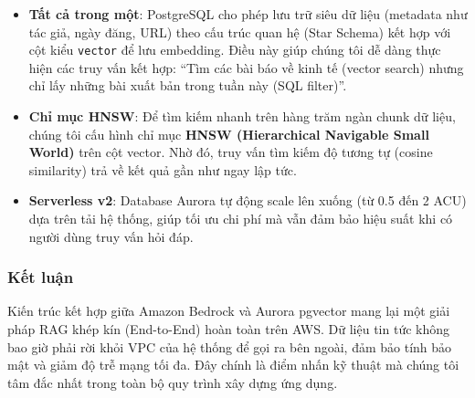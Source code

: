 \begin{itemize}
\tightlist
\item
  \textbf{Tất cả trong một}: PostgreSQL cho phép lưu trữ siêu dữ liệu
  (metadata như tác giả, ngày đăng, URL) theo cấu trúc quan hệ (Star
  Schema) kết hợp với cột kiểu \texttt{vector} để lưu embedding. Điều
  này giúp chúng tôi dễ dàng thực hiện các truy vấn kết hợp: ``Tìm các
  bài báo về kinh tế (vector search) nhưng chỉ lấy những bài xuất bản
  trong tuần này (SQL filter)''.
\item
  \textbf{Chỉ mục HNSW}: Để tìm kiếm nhanh trên hàng trăm ngàn chunk dữ
  liệu, chúng tôi cấu hình chỉ mục \textbf{HNSW (Hierarchical Navigable
  Small World)} trên cột vector. Nhờ đó, truy vấn tìm kiếm độ tương tự
  (cosine similarity) trả về kết quả gần như ngay lập tức.
\item
  \textbf{Serverless v2}: Database Aurora tự động scale lên xuống (từ
  0.5 đến 2 ACU) dựa trên tải hệ thống, giúp tối ưu chi phí mà vẫn đảm
  bảo hiệu suất khi có người dùng truy vấn hỏi đáp.
\end{itemize}

\hypertarget{kux1ebft-luux1eadn}{%
\subsubsection{Kết luận}}

Kiến trúc kết hợp giữa Amazon Bedrock và Aurora pgvector mang lại một
giải pháp RAG khép kín (End-to-End) hoàn toàn trên AWS. Dữ liệu tin tức
không bao giờ phải rời khỏi VPC của hệ thống để gọi ra bên ngoài, đảm
bảo tính bảo mật và giảm độ trễ mạng tối đa. Đây chính là điểm nhấn kỹ
thuật mà chúng tôi tâm đắc nhất trong toàn bộ quy trình xây dựng ứng
dụng.
